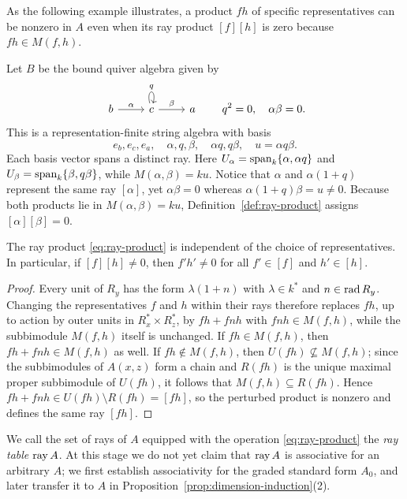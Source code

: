 As the following example illustrates, a product $fh$ of specific
representatives can be nonzero in $A$ even when its ray product $[f][h]$ is
zero because $fh\in M(f,h)$.

\begin{example}
\label{ex:zero-ray-span}
Let $B$ be the bound quiver algebra given by
\[
\begin{tikzcd}
b\arrow[r,"\alpha"]&c\arrow[r,"\beta"]\arrow[loop above,"q"]&a
\end{tikzcd}
\qquad q^2=0,\quad\alpha\beta=0.
\]
This is a representation-finite string algebra with basis
\[
 e_b,e_c,e_a,\quad\alpha,q,\beta,\quad\alpha q,q\beta,
       \quad u=\alpha q\beta.
\]
Each basis vector spans a distinct ray. Here
$U_{\alpha}=\operatorname{span}_k\{\alpha,\alpha q\}$ and
$U_{\beta}=\operatorname{span}_k\{\beta,q\beta\}$, while $M(\alpha,\beta)=ku$. Notice that
$\alpha$ and $\alpha(1+q)$ represent the same ray $[\alpha]$, yet
$\alpha\beta=0$ whereas $\alpha(1+q)\beta=u\ne0$. Because both products lie
in $M(\alpha,\beta)=ku$, Definition~\ref{def:ray-product} assigns
$[\alpha][\beta]=0$.
\end{example}

\begin{lemma}
\label{lem:ray-product-independent}
The ray product \eqref{eq:ray-product} is independent of the choice of
representatives. In particular, if $[f][h]\ne0$, then $f'h'\ne0$ for all
$f'\in[f]$ and $h'\in[h]$.
\end{lemma}
\begin{proof}
Every unit of $R_y$ has the form $\lambda(1+n)$ with $\lambda\in k^*$ and
$n\in\operatorname{rad} R_y$. Changing the representatives $f$ and $h$ within their rays
therefore replaces $fh$, up to action by outer units in $R_x^*\times R_z^*$,
by $fh+fnh$ with $fnh\in M(f,h)$, while the subbimodule $M(f,h)$ itself is
unchanged. If $fh\in M(f,h)$, then $fh+fnh\in M(f,h)$ as well. If
$fh\notin M(f,h)$, then $U(fh)\not\subseteq M(f,h)$; since the subbimodules
of $A(x,z)$ form a chain and $R(fh)$ is the unique maximal proper
subbimodule of $U(fh)$, it follows that $M(f,h)\subseteq R(fh)$. Hence
$fh+fnh\in U(fh)\setminus R(fh)=[fh]$, so the perturbed product is nonzero
and defines the same ray $[fh]$.
\end{proof}

We call the set of rays of $A$ equipped with the operation
\eqref{eq:ray-product} the \emph{ray table} $\operatorname{ray} A$. At this stage we do
not yet claim that $\operatorname{ray} A$ is associative for an arbitrary $A$; we first
establish associativity for the graded standard form $A_0$, and later
transfer it to $A$ in Proposition~\ref{prop:dimension-induction}(2).

